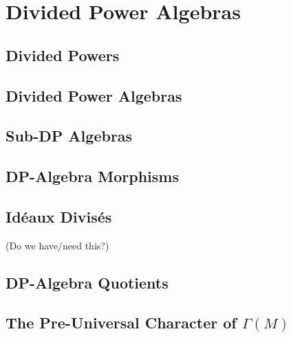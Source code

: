 %

\chapter{Divided Power Algebras}

\section{Divided Powers}

\section{Divided Power Algebras}

\section{Sub-DP Algebras}

\section{DP-Algebra Morphisms}

\section{Id\'eaux Divis\'es}
(Do we have/need this?)

\section{DP-Algebra Quotients}

\section{The Pre-Universal Character of \texorpdfstring{$\Gamma(M)$}{Gamma(M)}}

